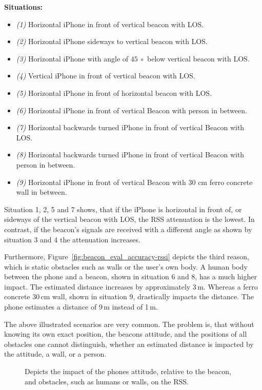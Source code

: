 \textbf{Situations:}
\begin{itemize}
  \item \emph{(1)} Horizontal iPhone in front of vertical beacon with \acs{LOS}.
  \item \emph{(2)} Horizontal iPhone sideways to vertical beacon with \acs{LOS}.
  \item \emph{(3)} Horizontal iPhone with angle of $45~\circ$ below vertical beacon with \acs{LOS}.
  \item \emph{(4)} Vertical iPhone in front of vertical beacon with \acs{LOS}.
  \item \emph{(5)} Horizontal iPhone in front of horizontal beacon with \acs{LOS}.
  \item \emph{(6)} Horizontal iPhone in front of vertical Beacon with person in between.
  \item \emph{(7)} Horizontal backwards turned iPhone in front of vertical Beacon with \acs{LOS}.
  \item \emph{(8)} Horizontal backwards turned iPhone in front of vertical Beacon with person in between.
  \item \emph{(9)} Horizontal iPhone in front of vertical Beacon with 30 cm ferro concrete wall in between.
\end{itemize}

\noindent Situation 1, 2, 5 and 7 shows, that if the iPhone is horizontal in front of, or sideways of the vertical beacon with \acs{LOS}, the \acs{RSS} attenuation is the lowest. In contrast, if the beacon's signals are received with a different angle as shown by situation 3 and 4 the attenuation increases.

Furthermore, Figure~\ref{fig:beacon_eval_accuracy-rssi} depicts the third reason, which is static obstacles such as walls or the user's own body. A human body between the phone and a beacon, shown in situation 6 and 8, has a much higher impact. The estimated distance increases by approximately 3\,m. Whereas a ferro concrete 30\,cm wall, shown in situation 9, drastically impacts the distance. The phone estimates a distance of 9\,m instead of 1\,m.

The above illustrated scenarios are very common. The problem is, that without knowing its own exact position, the beacons attitude, and the positions of all obstacles one cannot distinguish, whether an estimated distance is impacted by the attitude, a wall, or a person.

\begin{figure}
	
	\caption {Depicts the impact of the phones attitude, relative to the beacon, and obstacles, such as humans or walls, on the \acs{RSS}.} %
	\label{fig:beacon_eval_situations}
\end{figure}


